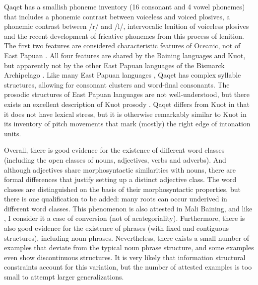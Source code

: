 \documentclass[a4paper, 11pt]{book}
\begin{document}
Qaqet has a smallish phoneme inventory (16 consonant and 4 vowel phonemes) that includes a phonemic contrast between voiceless and voiced plosives, a phonemic contrast between /r/ and /l/, intervocalic lenition of voiceless plosives and the recent development of fricative phonemes from this process of lenition.
The first two features are considered characteristic features of Oceanic, not of East Papuan \cite[743]{dunn2008structural}.
All four features are shared by the Baining languages and Kuot, but apparently not by the other East Papuan languages of the Bismarck Archipelago \citep{stebbins2009papuan}.
Like many East Papuan languages \citep[126]{lindstrom2007languages}, Qaqet has complex syllable structures, allowing for consonant clusters and word-final consonants.
The prosodic structures of East Papuan languages are not well-understood, but there exists an excellent description of Kuot prosody \citep{lindstrom2005aspects}.
Qaqet differs from Kuot in that it does not have lexical stress, but it is otherwise remarkably similar to Kuot in its inventory of pitch movements that mark (mostly) the right edge of intonation units.

Overall, there is good evidence for the existence of different word classes (including the open classes of nouns, adjectives, verbs and adverbs).
And although adjectives share morphosyntactic similarities with nouns, there are formal differences that justify setting up a distinct adjective class.
The word classes are distinguished on the basis of their morphosyntactic properties, but there is one qualification to be added: many roots can occur underived in different word classes.
This phenomenon is also attested in Mali Baining, and like \citet[58-59, 95-97]{stebbins2011mali} , I consider it a case of conversion (not of acategoriality).
Furthermore, there is also good evidence for the existence of phrases (with fixed and contiguous structures), including noun phrases. Nevertheless, there exists a small number of examples that deviate from the typical noun phrase structure, and some examples even show discontinuous structures. It is very likely that information structural constraints account for this variation, but the number of attested examples is too small to attempt larger generalizations.
\end{document}

